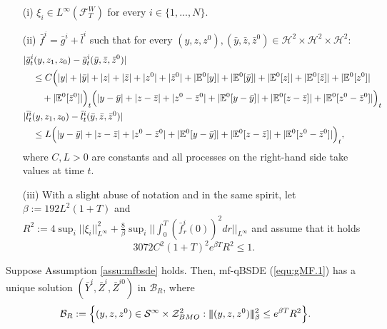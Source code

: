\documentclass[10pt,a4paper]{amsart}
\newcommand{\MF}{{\mathcal{F}}}
\newcommand{\be}{\begin{equation}}
\newcommand{\ee}{\end{equation}}
\newcommand{\trinm}[1]{\vert\!\vert\!\vert #1 \vert\!\vert\!\vert}
\begin{document}
\begin{Assumption}\label{assu:mfbsde}

\begin{itemize} 
     
\item[\textnormal{(i)}] $\xi_{i} \in L^{\infty}(\MF^W_T)$ for every $i \in \{1,...,N\}$.


\item[\textnormal{(ii)}] ${\bar{f}}^i = {\bar{g}}^i + {\bar{l}}^i$ such that for every $(y,z,z^{0}),(\bar{y},\bar{z},\bar{z}^{0}) \in \mathcal{H}^{2} \times \mathcal{H}^{2} \times \mathcal{H}^{2}:$
\begin{align*}
&|\bar{g}_{t}^{i}(y,z_{1},z_{0})-\bar{g}_{t}^{i}(\bar{y},\bar{z},\bar{z}^{0})| \\
&\ \ \ \leq C\Bigl(|y|+|\bar{y}|+|z|+|\bar{z}|+|z^{0}|+|\bar{z}^{0}|+|\mathbb{E}^{0}[y]|+|\mathbb{E}^{0}[\bar{y}]|+|\mathbb{E}^{0}[z]|+|\mathbb{E}^{0}[\bar{z}]|+|\mathbb{E}^{0}[z^{0}]| \\
&\ \ \ \ \ \ +|\mathbb{E}^{0}[\bar{z}^{0}]|\Bigr)_t \Bigl(|y-\bar{y}|+|z-\bar{z}|+|z^{0}-\bar{z}^{0}|+|\mathbb{E}^{0}[y-\bar{y}]|+|\mathbb{E}^{0}[z-\bar{z}]|+|\mathbb{E}^{0}[z^{0}-\bar{z}^{0}]|\Bigr)_t \\
&|\bar{l}_{t}^{i}(y,z_{1},z_{0})-\bar{l}_{t}^{i}(\bar{y},\bar{z},\bar{z}^{0})| \\
&\ \ \ \leq L\Bigl(|y-\bar{y}|+|z-\bar{z}|+|z^{0}-\bar{z}^{0}|+|\mathbb{E}^{0}[y-\bar{y}]|+|\mathbb{E}^{0}[z-\bar{z}]|+|\mathbb{E}^{0}[z^{0}-\bar{z}^{0}]|\Bigr)_t,
\end{align*}
where $C,L>0$ are constants and all processes on the right-hand side take values at time $t$.


\item[\textnormal{(iii)}] With a slight abuse of notation and in the same spirit, let
$
\beta := 192L^{2}(1+T) $ and \\
$
R^{2} := 4\sup_i||\xi_{i}||_{L^{\infty}}^{2} + \tfrac{8}{\beta} \sup_i \Big|\Big|\int_{0}^{T}(\bar{f}_{r}^{i}(0))^{2}dr\Big|\Big|_{L^{\infty}}
$
and assume that it holds
\be
3072C^{2}(1+T)^{2}e^{\beta T}R^{2} \leq 1.
\ee


\end{itemize}

    
\end{Assumption}

\begin{Theorem}
\label{Thm4.1}

Suppose Assumption \ref{assu:mfbsde} holds. 
Then, mf-qBSDE \textnormal{(\ref{equ:gMF.1})} has a unique solution $(\bar{Y}^{i},\bar{Z}^{i},\bar{Z}^{i0})$ in $\mathcal{B}_{R}$, where
\[
\mathcal{B}_{R} := \Bigl\{(y,z,z^{0}) \in \mathcal{S}^{\infty} \times \mathcal{Z}_{BMO}^{2} : \trinm{(y,z,z^{0})}_{\beta}^{2} \leq e^{\beta T}R^2\Bigr\}.
\]
\end{Theorem}
\end{document}
